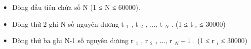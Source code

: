 \begin{itemize}
	\item     Dòng đầu tiên chứa số N (1 ≤ N ≤ 60000).   
	\item     Dòng thứ 2 ghi N số nguyên dương t    $_     1    $    , t    $_     2    $    , ...,   t    $_     N    $    . (1 ≤ t    $_     i    $    ≤ 30000)   
	\item     Dòng thứ ba ghi N-1 số nguyên dương r    $_     1    $    , r    $_     2    $    , ...,   r    $_     N-1    $    . (1 ≤ r    $_     i    $    ≤ 30000)   
\end{itemize}

\